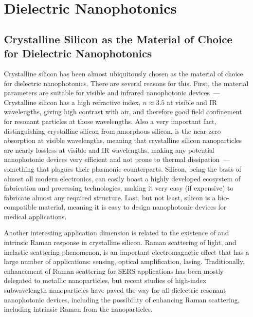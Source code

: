 \section{Dielectric Nanophotonics}
\label{ch:DielectricNanophotoics}

    \subsection{Crystalline Silicon as the Material of Choice for Dielectric Nanophotonics}
            Crystalline silicon has been almost ubiquitously chosen as the material of choice for dielectric nanophotonics.
        There are several reasons for this. First, the material parameters are suitable for visible and infrared nanophotonic devices~---
        Crystalline silicon has a high refractive index, $n \approx 3.5$ at visible and IR wavelengths\cite{li1980refractive}, giving high contrast
        with air, and therefore good field confinement for resonant particles at those wavelengths\cite{mie1908beitrage, dmitriev2016resonant}. Also
        a very important fact, distinguishing crystalline silicon from amorphous silicon, is the near zero absorption at visible wavelengths, meaning
        that crystalline silicon nanoparticles are nearly lossless at visible and IR wavelengths, making any potential nanophotonic devices very
        efficient and not prone to thermal dissipation~--- something that plagues their plasmonic counterparts.
            Silicon, being the basis of almost all modern electronics, can easily boast a highly developed ecosystem of fabrication and processing
        technologies, making it very easy (if expensive) to fabricate almost any required structure.
            Last, but not least, silicon is a bio-compatible material, meaning it is easy to design nanophotonic devices for medical applications.

            Another interesting application dimension is related to the existence of and intrinsic Raman response in crystalline silicon. Raman
        scattering of light, and inelastic scattering phenomenon, is an important electromagnetic effect\cite{hayes2012scattering} that has a large number of applications:
        sensing\cite{moskovits1985surface}, optical amplification\cite{islam2004wideband}, lasing\cite{pask2003design}.
        Traditionally, enhancement of Raman scattering for SERS applications has been mostly delegated to metallic nanoparticles, but
        recent studies of high-index subwavelength nanoparticles have paved the way for all-dielectric resonant nanophotonic devices, including
        the possibility of enhancing Raman scattering, including intrinsic Raman from the nanoparticles.

